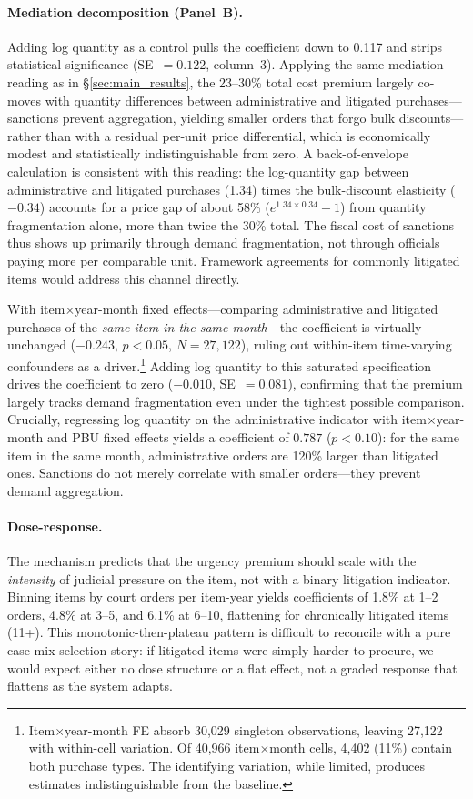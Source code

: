 \paragraph{Mediation decomposition (Panel~B).}
Adding log quantity as a control pulls the coefficient down to 0.117 and strips statistical significance (SE~$= 0.122$, column~3). Applying the same mediation reading as in \S\ref{sec:main_results}, the 23--30\% total cost premium largely co-moves with quantity differences between administrative and litigated purchases---sanctions prevent aggregation, yielding smaller orders that forgo bulk discounts---rather than with a residual per-unit price differential, which is economically modest and statistically indistinguishable from zero. A back-of-envelope calculation is consistent with this reading: the log-quantity gap between administrative and litigated purchases (1.34) times the bulk-discount elasticity ($-0.34$) accounts for a price gap of about 58\% ($e^{1.34 \times 0.34} - 1$) from quantity fragmentation alone, more than twice the 30\% total. The fiscal cost of sanctions thus shows up primarily through demand fragmentation, not through officials paying more per comparable unit. Framework agreements for commonly litigated items would address this channel directly.

With item$\times$year-month fixed effects---comparing administrative and litigated purchases of the \emph{same item in the same month}---the coefficient is virtually unchanged ($-0.243$, $p < 0.05$, $N = 27{,}122$), ruling out within-item time-varying confounders as a driver.\footnote{Item$\times$year-month FE absorb 30,029 singleton observations, leaving 27,122 with within-cell variation. Of 40,966 item$\times$month cells, 4,402 (11\%) contain both purchase types. The identifying variation, while limited, produces estimates indistinguishable from the baseline.} Adding log quantity to this saturated specification drives the coefficient to zero ($-0.010$, SE~$= 0.081$), confirming that the premium largely tracks demand fragmentation even under the tightest possible comparison. Crucially, regressing log quantity on the administrative indicator with item$\times$year-month and PBU fixed effects yields a coefficient of $0.787$ ($p < 0.10$): for the same item in the same month, administrative orders are 120\% larger than litigated ones. Sanctions do not merely correlate with smaller orders---they prevent demand aggregation.

\paragraph{Dose-response.} The mechanism predicts that the urgency premium should scale with the \emph{intensity} of judicial pressure on the item, not with a binary litigation indicator. Binning items by court orders per item-year yields coefficients of 1.8\% at 1--2 orders, 4.8\% at 3--5, and 6.1\% at 6--10, flattening for chronically litigated items (11+). This monotonic-then-plateau pattern is difficult to reconcile with a pure case-mix selection story: if litigated items were simply harder to procure, we would expect either no dose structure or a flat effect, not a graded response that flattens as the system adapts.

